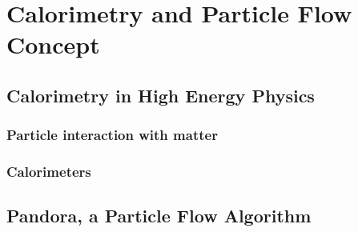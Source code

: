 \chapter{Calorimetry and Particle Flow Concept}

\section{Calorimetry in High Energy Physics}

\subsection{Particle interaction with matter}
\label{subsec:PartInter}

\subsection{Calorimeters}

\section{Pandora, a Particle Flow Algorithm}
\label{sec:PFA}
